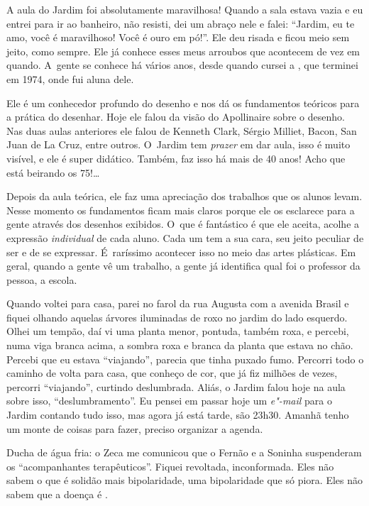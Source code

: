 A aula do Jardim foi absolutamente maravilhosa! Quando a sala estava
vazia e eu entrei para ir ao banheiro, não resisti, dei um abraço nele e
falei: ``Jardim, eu te amo, você é maravilhoso! Você é ouro em pó!''.
Ele deu risada e ficou meio sem jeito, como sempre. Ele já conhece esses
meus arroubos que acontecem de vez em quando. A~gente se conhece há
vários anos, desde quando cursei a , que terminei em 1974, onde fui
aluna dele.

Ele é um conhecedor profundo do desenho e nos dá os fundamentos teóricos
para a prática do desenhar. Hoje ele falou da visão do Apollinaire sobre
o desenho. Nas duas aulas anteriores ele falou de Kenneth Clark, Sérgio
Milliet, Bacon, San Juan de La Cruz, entre outros. O~Jardim tem
\emph{prazer} em dar aula, isso é muito visível, e ele é super didático.
Também, faz isso há mais de 40 anos! Acho que está beirando os
75!…

Depois da aula teórica, ele faz uma apreciação dos trabalhos que os
alunos levam. Nesse momento os fundamentos ficam mais claros porque ele
os esclarece para a gente através dos desenhos exibidos. O~que é
fantástico é que ele aceita, acolhe a expressão \emph{individual} de
cada aluno. Cada um tem a sua cara, seu jeito peculiar de ser e de se
expressar. É~raríssimo acontecer isso no meio das artes plásticas. Em
geral, quando a gente vê um trabalho, a gente já identifica qual foi o
professor da pessoa, a escola.

Quando voltei para casa, parei no farol da rua Augusta com a avenida
Brasil e fiquei olhando aquelas árvores iluminadas de roxo no jardim do
lado esquerdo. Olhei um tempão, daí vi uma planta menor, pontuda, também
roxa, e percebi, numa viga branca acima, a sombra roxa e branca da
planta que estava no chão. Percebi que eu estava ``viajando'', parecia
que tinha puxado fumo. Percorri todo o caminho de volta para casa, que
conheço de cor, que já fiz milhões de vezes, percorri ``viajando'',
curtindo deslumbrada. Aliás, o Jardim falou hoje na aula sobre isso,
``deslumbramento''. Eu pensei em passar hoje um \emph{e"-mail} para o
Jardim contando tudo isso, mas agora já está tarde, são 23h30. Amanhã
tenho um monte de coisas para fazer, preciso organizar a agenda.

Ducha de água fria: o Zeca me comunicou que o Fernão e a Soninha
suspenderam os ``acompanhantes terapêuticos''. Fiquei revoltada,
inconformada. Eles não sabem o que é solidão mais bipolaridade, uma
bipolaridade que só piora. Eles não sabem que a doença é .

